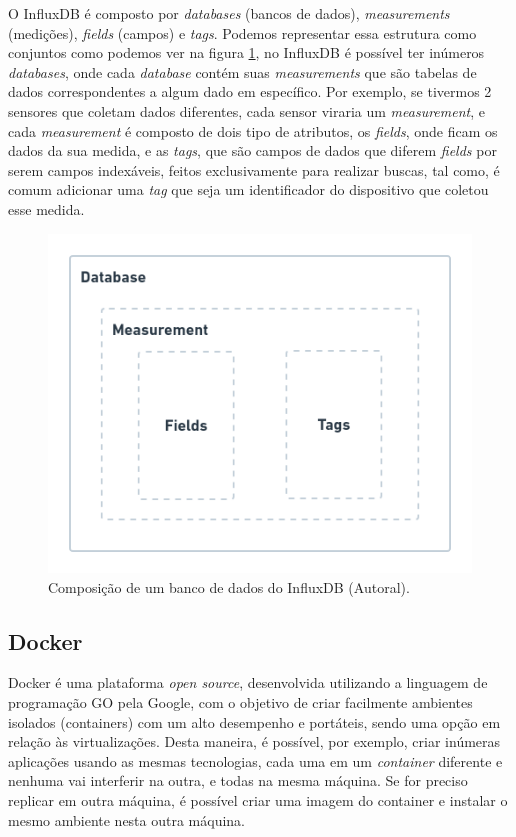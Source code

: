 O InfluxDB é composto por \textit{databases} (bancos de dados), \textit{measurements} (medições), \textit{fields} (campos) e \textit{tags}. Podemos representar essa estrutura como conjuntos como podemos ver na figura \ref{fig:influxdb-struct}, no InfluxDB é possível ter inúmeros \textit{databases}, onde cada \textit{database} contém suas \textit{measurements} que são tabelas de dados correspondentes a algum dado em específico. Por exemplo, se tivermos 2 sensores que coletam dados diferentes, cada sensor viraria um \textit{measurement}, e cada \textit{measurement} é composto  de dois tipo de atributos, os \textit{fields}, onde ficam os dados da sua medida, e as \textit{tags}, que são campos de dados que diferem \textit{fields} por serem campos indexáveis, feitos exclusivamente para realizar buscas, tal como, é comum adicionar uma \textit{tag} que seja um identificador do dispositivo que coletou esse medida.

\begin{figure}[H]
  \centering
  \includegraphics[width=.80\textwidth]{assets/influxdb-struct.png} 
  \caption{Composição de um banco de dados do InfluxDB (Autoral).}
  \label{fig:influxdb-struct} 
\end{figure}

\subsection{Docker}
\label{fund:docker}
Docker é uma plataforma \textit{open source}, desenvolvida utilizando a linguagem de programação GO pela Google, com o objetivo de criar facilmente  ambientes isolados (containers) com um alto desempenho e portáteis, sendo uma opção em relação às virtualizações. Desta maneira, é possível, por exemplo, criar inúmeras aplicações usando as mesmas tecnologias, cada uma em um \textit{container} diferente e nenhuma vai interferir na outra, e todas na mesma máquina. Se for preciso replicar em outra máquina, é possível criar uma imagem do container e instalar o mesmo ambiente nesta outra máquina.

